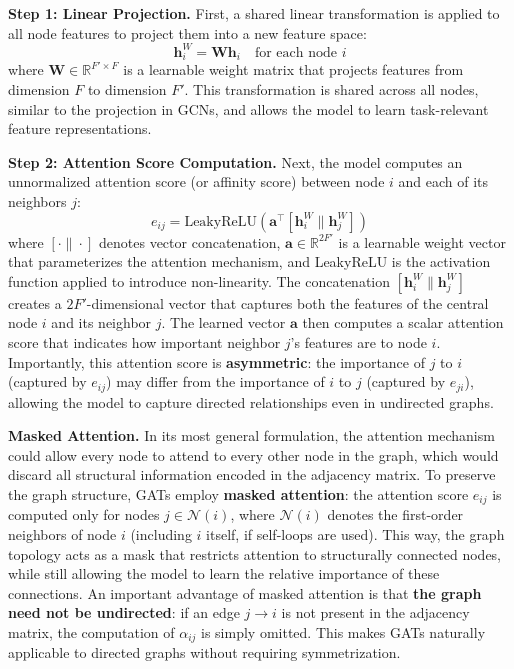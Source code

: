 \begin{compactitemize}
\item \textbf{Step 1: Linear Projection.} First, a shared linear transformation is applied to all node features to project them into a new feature space:
$$\mathbf{h}_i^W = \mathbf{W}\mathbf{h}_i \quad \text{for each node } i$$
where $\mathbf{W} \in \mathbb{R}^{F' \times F}$ is a learnable weight matrix that projects features from dimension $F$ to dimension $F'$. This transformation is shared across all nodes, similar to the projection in GCNs, and allows the model to learn task-relevant feature representations.

\item \textbf{Step 2: Attention Score Computation.} Next, the model computes an unnormalized attention score (or affinity score) between node $i$ and each of its neighbors $j$:
$$e_{ij} = \text{LeakyReLU}\left(\mathbf{a}^\top [\mathbf{h}_i^W \| \mathbf{h}_j^W]\right)$$
where $[\cdot \| \cdot]$ denotes vector concatenation, $\mathbf{a} \in \mathbb{R}^{2F'}$ is a learnable weight vector that parameterizes the attention mechanism, and LeakyReLU is the activation function applied to introduce non-linearity. The concatenation $[\mathbf{h}_i^W \| \mathbf{h}_j^W]$ creates a $2F'$-dimensional vector that captures both the features of the central node $i$ and its neighbor $j$. The learned vector $\mathbf{a}$ then computes a scalar attention score that indicates how important neighbor $j$'s features are to node $i$. Importantly, this attention score is \textbf{asymmetric}: the importance of $j$ to $i$ (captured by $e_{ij}$) may differ from the importance of $i$ to $j$ (captured by $e_{ji}$), allowing the model to capture directed relationships even in undirected graphs.

\item \textbf{Masked Attention.} In its most general formulation, the attention mechanism could allow every node to attend to every other node in the graph, which would discard all structural information encoded in the adjacency matrix. To preserve the graph structure, GATs employ \textbf{masked attention}: the attention score $e_{ij}$ is computed only for nodes $j \in \mathcal{N}(i)$, where $\mathcal{N}(i)$ denotes the first-order neighbors of node $i$ (including $i$ itself, if self-loops are used). This way, the graph topology acts as a mask that restricts attention to structurally connected nodes, while still allowing the model to learn the relative importance of these connections. An important advantage of masked attention is that \textbf{the graph need not be undirected}: if an edge $j \to i$ is not present in the adjacency matrix, the computation of $\alpha_{ij}$ is simply omitted. This makes GATs naturally applicable to directed graphs without requiring symmetrization.


\end{compactitemize}
